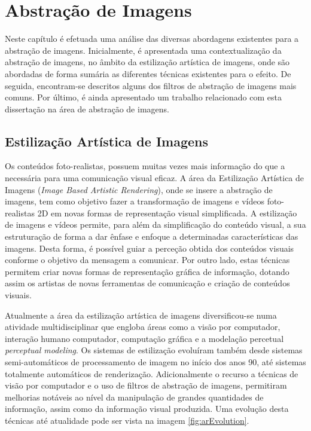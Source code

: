 \chapter{Abstração de Imagens} \label{chap:abstracao}

Neste capítulo é efetuada uma análise das diversas abordagens existentes para a abstração de imagens. Inicialmente, é apresentada uma contextualização da abstração de imagens, no âmbito da estilização artística de imagens, onde são abordadas de forma sumária as diferentes técnicas existentes para o efeito. De seguida, encontram-se descritos alguns dos filtros de abstração de imagens mais comuns. Por último, é ainda apresentado um trabalho relacionado com esta dissertação na área de abstração de imagens.

\section{Estilização Artística de Imagens}
Os conteúdos foto-realistas, possuem muitas vezes mais informação do que a necessária para uma comunicação visual eficaz. A área da Estilização Artística de Imagens (\textit{Image Based Artistic Rendering}), onde se insere a abstração de imagens,  tem como objetivo fazer a transformação de imagens e vídeos foto-realistas 2D em novas formas de representação visual simplificada. A estilização de imagens e vídeos permite, para além da simplificação do conteúdo visual, a sua estruturação de forma a dar ênfase e enfoque a determinadas características das imagens. Desta forma, é possível guiar a perceção obtida dos conteúdos visuais conforme o objetivo da mensagem a comunicar. Por outro lado, estas técnicas permitem criar novas formas de representação gráfica de informação, dotando assim os artistas de novas ferramentas de comunicação e criação de conteúdos visuais.

Atualmente a área da estilização artística de imagens diversificou-se numa atividade multidisciplinar que engloba áreas como a visão por computador, interação humano computador, computação gráfica e a modelação percetual \textit{perceptual modeling}. Os sistemas de estilização evoluíram também desde sistemas semi-automáticos de processamento de imagem no início dos anos 90, até sistemas totalmente automáticos de renderização. Adicionalmente o recurso a técnicas de visão por computador e o uso de filtros de abstração de imagens, permitiram melhorias notáveis ao nível da manipulação de grandes quantidades de informação, assim como da informação visual produzida. Uma evolução desta técnicas até atualidade pode ser vista na imagem \ref{fig:arEvolution}.

